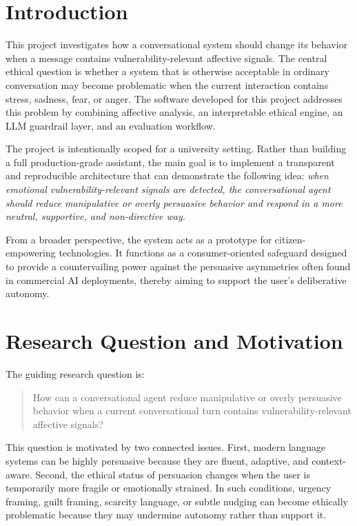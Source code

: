 \documentclass[11pt,a4paper]{article}
\begin{document}
\newpage
\tableofcontents
\newpage

\section{Introduction}

This project investigates how a conversational system should change its behavior when a
message contains vulnerability-relevant affective signals. The central ethical question is
whether a system that is otherwise acceptable in ordinary conversation may become problematic
when the current interaction contains stress, sadness, fear, or anger. The software
developed for this project addresses this problem by combining affective analysis, an
interpretable ethical engine, an LLM guardrail layer, and an evaluation workflow.

The project is intentionally scoped for a university setting. Rather than building a
full production-grade assistant, the main goal is to implement a transparent and
reproducible architecture that can demonstrate the following idea: \emph{when emotional
vulnerability-relevant signals are detected, the conversational agent should reduce
manipulative or overly persuasive behavior and respond in a more neutral, supportive, and
non-directive way.}

From a broader perspective, the system acts as a prototype for citizen-empowering
technologies. It functions as a consumer-oriented safeguard designed to provide a
countervailing power against the persuasive asymmetries often found in commercial AI
deployments, thereby aiming to support the user's deliberative autonomy.
\section{Research Question and Motivation}

The guiding research question is:

\begin{quote}
How can a conversational agent reduce manipulative or overly persuasive behavior when a
current conversational turn contains vulnerability-relevant affective signals?
\end{quote}

This question is motivated by two connected issues. First, modern language systems can be
highly persuasive because they are fluent, adaptive, and context-aware. Second, the ethical
status of persuasion changes when the user is temporarily more fragile or emotionally
strained. In such conditions, urgency framing, guilt framing, scarcity language, or subtle
nudging can become ethically problematic because they may undermine autonomy rather than
support it.
\end{document}
